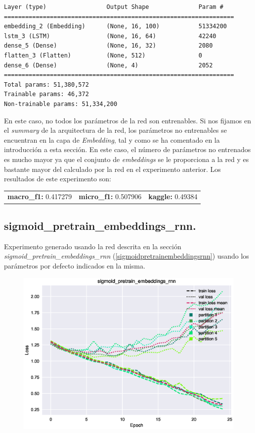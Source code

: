 \documentclass[11pt]{article}
\begin{document}
\begin{verbatim}
Layer (type)                 Output Shape              Param #   
=================================================================
embedding_2 (Embedding)      (None, 16, 100)           51334200  
lstm_3 (LSTM)                (None, 16, 64)            42240     
dense_5 (Dense)              (None, 16, 32)            2080      
flatten_3 (Flatten)          (None, 512)               0         
dense_6 (Dense)              (None, 4)                 2052      
=================================================================
Total params: 51,380,572
Trainable params: 46,372
Non-trainable params: 51,334,200
\end{verbatim}

En este caso, no todos los parámetros de la red son entrenables. Si nos fijamos en el \textit{summary} de la arquitectura de la red, los parámetros no entrenables se encuentran en la capa de \textit{Embedding}, tal y como se ha comentado en la introducción a esta sección. En este caso, el número de parámetros no entrenados es mucho mayor ya que el conjunto de \textit{embeddings} se le proporciona a la red y es bastante mayor del calculado por la red en el experimento anterior. Los resultados de este experimento son: 

\begin{table}[H]
\begin{tabular}{c|c|c}
\textbf{macro\_f1:} 0.417279 & \textbf{micro\_f1:} 0.507906 & \textbf{kaggle:} 0.49384
\end{tabular}
\end{table}

\subsection{sigmoid\_pretrain\_embeddings\_rnn.} \label{exp_sigmoidpretrainembeddingsrnn}

Experimento generado usando la red descrita en la sección \textit{sigmoid\_pretrain\_embeddings\_rnn} (\ref{sigmoidpretrainembeddingsrnn}) usando los parámetros por defecto indicados en la misma.

\begin{figure}[H]
\includegraphics[width=\linewidth]{images/loss/sigmoid_pretrain_embeddings_rnn-1554203570.eps}
\end{figure}
\end{document}
